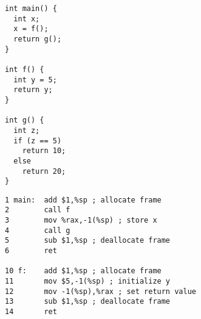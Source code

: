 \documentclass[acmsmall,review,anonymous]{acmart}\settopmatter{printfolios=true,printccs=false,printacmref=false}
\begin{document}
\begin{figure}

\begin{subfigure}{.2\textwidth}
  {\small
\begin{verbatim}
int main() {
  int x;
  x = f();
  return g();
}

int f() {
  int y = 5;
  return y;
}

int g() {
  int z;
  if (z == 5)
    return 10;
  else
    return 20;
}
\end{verbatim}
}
\end{subfigure}
\begin{subfigure}{.5\textwidth}
  {\small
\begin{verbatim}
1 main:  add $1,%sp ; allocate frame
2        call f
3        mov %rax,-1(%sp) ; store x
4        call g
5        sub $1,%sp ; deallocate frame
6        ret 

10 f:    add $1,%sp ; allocate frame
11       mov $5,-1(%sp) ; initialize y
12       mov -1(%sp),%rax ; set return value
13       sub $1,%sp ; deallocate frame
14       ret


\end{verbatim}}
\end{subfigure}
\end{figure}
\end{document}
